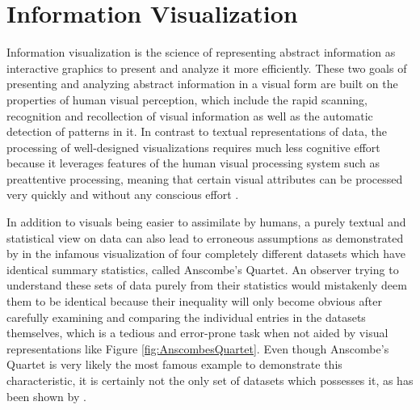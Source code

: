 \chapter{Information Visualization}
\label{chap:InfoVis}

Information visualization is the science of representing abstract information as interactive graphics to present and analyze it more efficiently. 
These two goals of presenting and analyzing abstract information in a visual form are built on the properties of human visual perception, which include the rapid scanning, recognition and recollection of visual information as well as the automatic detection of patterns in it.
In contrast to textual representations of data, the processing of well-designed visualizations requires much less cognitive effort because it leverages features of the human visual processing system such as preattentive processing, meaning that certain visual attributes can be processed very quickly and without any conscious effort \parencite{PreattentiveProcessing}. 

In addition to visuals being easier to assimilate by humans, a purely textual and statistical view on data can also lead to erroneous assumptions as demonstrated by \cite{AnscombesQuartet} in the infamous visualization of four completely different datasets which have identical summary statistics, called Anscombe's Quartet. An observer trying to understand these sets of data purely from their statistics would mistakenly deem them to be identical because their inequality will only become obvious after carefully examining and comparing the individual entries in the datasets themselves, which is a tedious and error-prone task when not aided by visual representations like Figure \ref{fig:AnscombesQuartet}. Even though Anscombe's Quartet is very likely the most famous example to demonstrate this characteristic, it is certainly not the only set of datasets which possesses it, as has been shown by \cite{GenDataIdenticalStatisticsDissimilarGraphics}.

